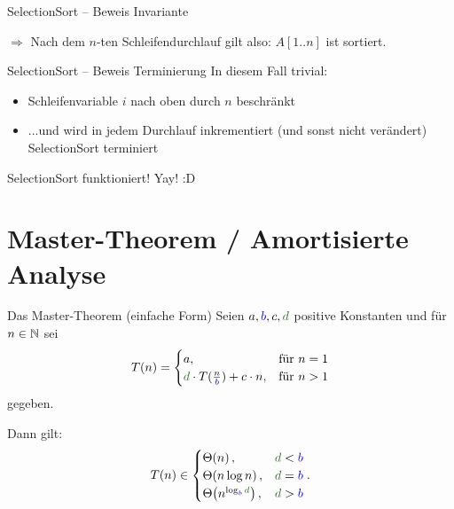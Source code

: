 {\begin{frame}{SelectionSort -- Beweis Invariante}
\begin{overlayarea}{\textwidth}{.60\textwidth}
			$\Rightarrow$ Nach dem $n$-ten Schleifendurchlauf gilt also: $A[1..n]$ ist sortiert.
		\end{overlayarea}
	\end{frame}
	
	\begin{frame}{SelectionSort -- Beweis Terminierung}
		In diesem Fall trivial: 
		\begin{itemize}
			\item Schleifenvariable $i$ nach oben durch $n$ beschränkt
			\item ...und wird in jedem Durchlauf inkrementiert (und sonst nicht verändert)
			\implitem SelectionSort terminiert
		\end{itemize}
		\impl SelectionSort funktioniert! Yay! :D
	\end{frame}
	
}



\section{Master-Theorem / Amortisierte Analyse}

\begin{frame}{Das Master-Theorem (einfache Form)} 
	Seien $a, \textcolor{blue}{b}, c, \textcolor{darkgreen}{d}$ positive Konstanten und für $n \in \mathbb{N}$ sei 
	\[
	T(n) = 
	\begin{cases}
	a,  & \text{für } n = 1 \\
	\textcolor{darkgreen}{d} \cdot T\large(\frac{n}{\textcolor{blue}{b}}\large) + c\*n, & \text{für } n > 1
	\end{cases}
	\]
	gegeben. \\ \smallskip
	
	Dann gilt:
	\[
	T(n) \in 
	\begin{cases}
	\Th{n},                                                        & \textcolor{darkgreen}{d} < \textcolor{blue}{b} \\
	\Th{n \log n},                                                 & \textcolor{darkgreen}{d} = \textcolor{blue}{b} \\
	\Th{n^{\log _{\textcolor{blue}{b}} \textcolor{darkgreen}{d}}}, & \textcolor{darkgreen}{d} > \textcolor{blue}{b}
	\end{cases}.
	\]
\end{frame}




